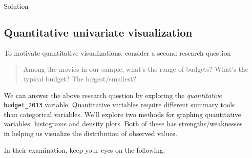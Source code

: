 \documentclass[
  letterpaper,
  DIV=11,
  numbers=noendperiod]{scrreprt}
\newenvironment{Shaded}{\begin{snugshade}}{\end{snugshade}}
\newcommand{\DecValTok}[1]{\textcolor[rgb]{0.68,0.00,0.00}{#1}}
\newcommand{\DocumentationTok}[1]{\textcolor[rgb]{0.37,0.37,0.37}{\textit{#1}}}
\newcommand{\FunctionTok}[1]{\textcolor[rgb]{0.28,0.35,0.67}{#1}}
\newcommand{\NormalTok}[1]{\textcolor[rgb]{0.00,0.23,0.31}{#1}}
\newcommand{\SpecialCharTok}[1]{\textcolor[rgb]{0.37,0.37,0.37}{#1}}
\begin{document}
Solution

\begin{Shaded}
\end{Shaded}

\hfill\break

\subsection*{Quantitative univariate
visualization}\label{quantitative-univariate-visualization}

To motivate quantitative visualizations, consider a second research
question

\begin{quote}
Among the movies in our sample, what's the range of budgets? What's the
typical budget? The largest/smallest?
\end{quote}

We can answer the above research question by exploring the
\emph{quantitative} \texttt{budget\_2013} variable. Quantitative
variables require different summary tools than categorical variables.
We'll explore two methods for graphing quantitative variables:
histograms and density plots. Both of these has strengths/weaknesses in
helping us visualize the distribution of observed values.

In their examination, keep your eyes on the following.
\end{document}
